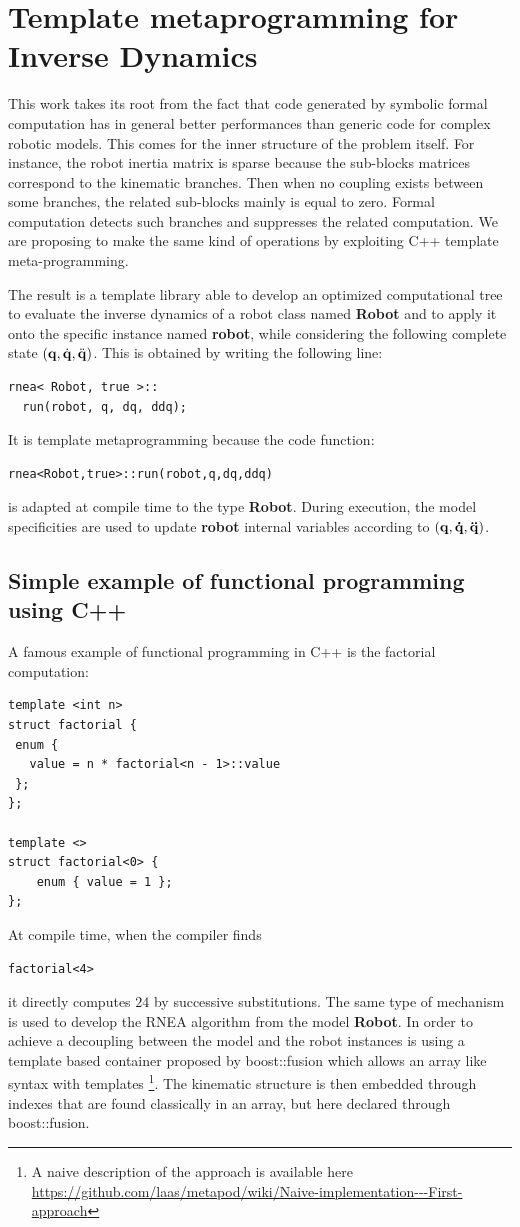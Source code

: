 \section{Template metaprogramming for Inverse Dynamics}

This work takes its root from the fact that code generated by symbolic formal computation
has in general better performances than generic code for complex robotic models.
This comes for the inner structure of the problem itself. 
For instance, the robot inertia matrix is sparse because the sub-blocks matrices correspond
to the kinematic branches. Then when no coupling exists between some branches, the related sub-blocks mainly is equal to zero.
Formal computation detects such branches and suppresses the related computation.
We are proposing to make the same kind of operations by exploiting C++ template meta-programming.

The result is a template library able to develop an optimized computational tree to 
evaluate the inverse dynamics of a robot class named \textbf{Robot} and to apply it onto the specific instance
named \textbf{robot}, while considering the following complete state $({\bf q}, \dot{\bf q}, \ddot{\bf q})$.
This is obtained by writing the following line:
\begin{verbatim}
rnea< Robot, true >::
  run(robot, q, dq, ddq);
\end{verbatim}
It is template metaprogramming because the code function:
\begin{verbatim}
rnea<Robot,true>::run(robot,q,dq,ddq)
\end{verbatim}
is adapted at compile time to the type \textbf{Robot}. 
During execution, the model specificities are used to update  \textbf{robot}
internal variables according to $(\bf{q},\dot{\bf q},\ddot{\bf q})$.

\subsection{Simple example of functional programming using C++}
A famous example of functional programming in C++ is the factorial computation:
\begin{verbatim}
template <int n>
struct factorial {
 enum { 
   value = n * factorial<n - 1>::value 
 };
};
 
template <>
struct factorial<0> {
	enum { value = 1 };
};
\end{verbatim}
At compile time, when the compiler finds  \begin{verbatim}factorial<4>\end{verbatim}
it directly computes $24$ by successive substitutions.
The same type of mechanism is used to develop the RNEA algorithm from the model \textbf{Robot}.
In order to achieve a decoupling between the model and the robot instances \softmetapod is using 
a template based container proposed by boost::fusion
which allows an array like syntax with templates \footnote{
A naive description of the approach is available here
\url{https://github.com/laas/metapod/wiki/Naive-implementation---First-approach}}.
The kinematic structure is then embedded through indexes that are found classically in an array,
but here declared through boost::fusion.

